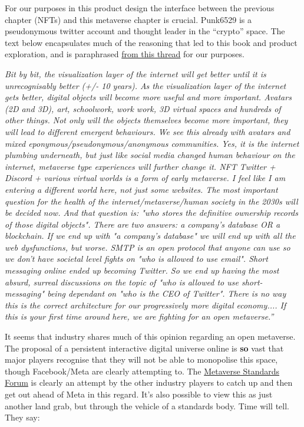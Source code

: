For our purposes in this product design the interface between the previous chapter (NFTs) and this metaverse chapter is crucial. Punk6529 is a pseudonymous twitter account and thought leader in the ``crypto'' space. The text below encapsulates much of the reasoning that led to this book and product exploration, and is paraphrased \href{https://twitter.com/punk6529/status/1536046831045685248}{from this thread} for our purposes.\par
\textit{Bit by bit, the visualization layer of the internet will get better until it is unrecognisably better (+/- 10 years). As the visualization layer of the internet gets better, digital objects will become more useful and more important. Avatars (2D and 3D), art, schoolwork, work work, 3D virtual spaces and hundreds of other things. Not only will the objects themselves become more important, they will lead to different emergent behaviours. We see this already with avatars and mixed eponymous/pseudonymous/anonymous communities. Yes, it is the internet plumbing underneath, but just like social media changed human behaviour on the internet, metaverse type experiences will further change it. NFT Twitter + Discord + various virtual worlds is a form of early metaverse. I feel like I am entering a different world here, not just some websites. The most important question for the health of the internet/metaverse/human society in the 2030s will be decided now. And that question is: "who stores the definitive ownership records of those digital objects". There are two answers: a company's database OR a blockchain. If we end up with "a company's database" we will end up with all the web dysfunctions, but worse. SMTP is an open protocol that anyone can use so we don't have societal level fights on "who is allowed to use email". Short messaging online ended up becoming Twitter. So we end up having the most absurd, surreal discussions on the topic of "who is allowed to use short-messaging" being dependant on "who is the CEO of Twitter". There is no way this is the correct architecture for our progressively more digital economy.... If this is your first time around here, we are fighting for an open metaverse.''}\par
It seems that industry shares much of this opinion regarding an open metaverse. The proposal of a persistent interactive digital universe online is \textbf{so} vast that major players recognise that they will not be able to monopolise this space, though Facebook/Meta are clearly attempting to. The \href{https://metaverse-standards.org/news/press-releases/leading-standards-organizations-and-companies-unite-to-drive-open-metaverse-interoperability/}{Metaverse Standards Forum} is clearly an attempt by the other industry players to catch up and then get out ahead of Meta in this regard. It's also possible to view this as just another land grab, but through the vehicle of a standards body. Time will tell. They say:\par
